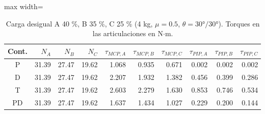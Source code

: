\begin{table}[H]
\centering
\small
\begin{adjustbox}{max width=\textwidth}
\begin{tabular}{|c|r|r|r|r|r|r|r|r|r|}
\hline
\textbf{Cont.} & \textbf{$N_A$} & \textbf{$N_B$} & \textbf{$N_C$} & \textbf{$\tau_{MCP,A}$} & \textbf{$\tau_{MCP,B}$} & \textbf{$\tau_{MCP,C}$} & \textbf{$\tau_{PIP,A}$} & \textbf{$\tau_{PIP,B}$} & \textbf{$\tau_{PIP,C}$} \\ \hline
P & 31.39 & 27.47 & 19.62 & 1.068 & 0.935 & 0.671 & 0.002 & 0.002 & 0.002 \\ \hline
D & 31.39 & 27.47 & 19.62 & 2.207 & 1.932 & 1.382 & 0.456 & 0.399 & 0.286 \\ \hline
T & 31.39 & 27.47 & 19.62 & 2.603 & 2.279 & 1.630 & 0.853 & 0.746 & 0.534 \\ \hline
PD & 31.39 & 27.47 & 19.62 & 1.637 & 1.434 & 1.027 & 0.229 & 0.200 & 0.144 \\ \hline
\end{tabular}
\end{adjustbox}
\caption{Carga desigual A 40 \%, B 35 \%, C 25 \% (4 kg, $\mu=0.5$, $\theta=30°/30°$). Torques en las articulaciones en N$\cdot$m.}
\label{tab:desigual}
\end{table}